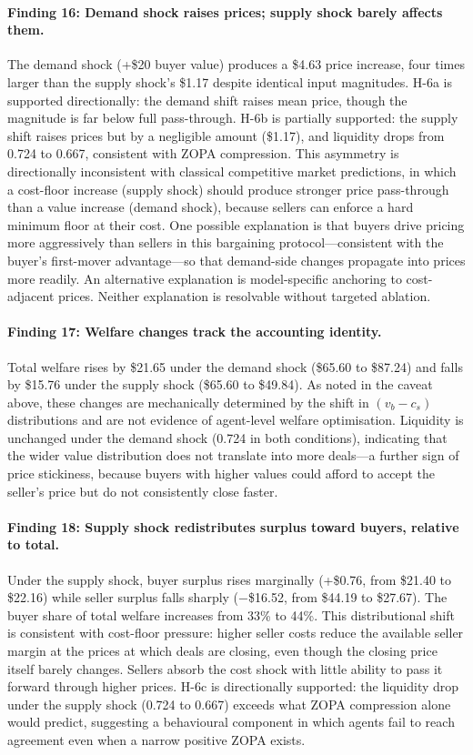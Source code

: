 \paragraph{Finding 16: Demand shock raises prices; supply shock barely affects them.}
The demand shock (+\$20 buyer value) produces a \$4.63 price increase, four times larger than the supply shock's \$1.17 despite identical input magnitudes.  H-6a is supported directionally: the demand shift raises mean price, though the magnitude is far below full pass-through.  H-6b is partially supported: the supply shift raises prices but by a negligible amount (\$1.17), and liquidity drops from 0.724 to 0.667, consistent with ZOPA compression.  This asymmetry is directionally inconsistent with classical competitive market predictions, in which a cost-floor increase (supply shock) should produce stronger price pass-through than a value increase (demand shock), because sellers can enforce a hard minimum floor at their cost.  One possible explanation is that buyers drive pricing more aggressively than sellers in this bargaining protocol---consistent with the buyer's first-mover advantage---so that demand-side changes propagate into prices more readily.  An alternative explanation is model-specific anchoring to cost-adjacent prices.  Neither explanation is resolvable without targeted ablation.

\paragraph{Finding 17: Welfare changes track the accounting identity.}
Total welfare rises by \$21.65 under the demand shock (\$65.60 to \$87.24) and falls by \$15.76 under the supply shock (\$65.60 to \$49.84).  As noted in the caveat above, these changes are mechanically determined by the shift in $(v_b - c_s)$ distributions and are not evidence of agent-level welfare optimisation.  Liquidity is unchanged under the demand shock (0.724 in both conditions), indicating that the wider value distribution does not translate into more deals---a further sign of price stickiness, because buyers with higher values could afford to accept the seller's price but do not consistently close faster.

\paragraph{Finding 18: Supply shock redistributes surplus toward buyers, relative to total.}
Under the supply shock, buyer surplus rises marginally (+\$0.76, from \$21.40 to \$22.16) while seller surplus falls sharply ($-$\$16.52, from \$44.19 to \$27.67).  The buyer share of total welfare increases from 33\% to 44\%.  This distributional shift is consistent with cost-floor pressure: higher seller costs reduce the available seller margin at the prices at which deals are closing, even though the closing price itself barely changes.  Sellers absorb the cost shock with little ability to pass it forward through higher prices.  H-6c is directionally supported: the liquidity drop under the supply shock (0.724 to 0.667) exceeds what ZOPA compression alone would predict, suggesting a behavioural component in which agents fail to reach agreement even when a narrow positive ZOPA exists.

